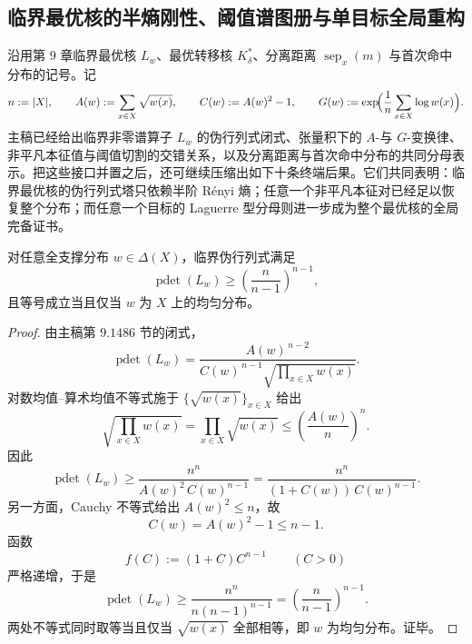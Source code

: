 \subsection{临界最优核的半熵刚性、阈值谱图册与单目标全局重构}\label{subsec:conclusion-critical-kernel-halfentropy-threshold-hitting-reconstruction}
沿用第 \(9\) 章临界最优核 \(L_w\)、最优转移核 \(K_\delta^\ast\)、分离距离 \(\operatorname{sep}_x(m)\) 与首次命中分布的记号。记
\[
n:=|X|,
\qquad
A(w):=\sum_{x\in X}\sqrt{w(x)},
\qquad
C(w):=A(w)^2-1,
\qquad
G(w):=\exp\!\Bigl(\frac1n\sum_{x\in X}\log w(x)\Bigr).
\]
主稿已经给出临界非零谱算子 \(L_w\) 的伪行列式闭式、张量积下的 \(A\)-与 \(G\)-变换律、非平凡本征值与阈值切割的交错关系，以及分离距离与首次命中分布的共同分母表示。把这些接口并置之后，还可继续压缩出如下十条终端后果。它们共同表明：临界最优核的伪行列式塔只依赖半阶 Rényi 熵；任意一个非平凡本征对已经足以恢复整个分布；而任意一个目标的 Laguerre 型分母则进一步成为整个最优核的全局完备证书。

\begin{theorem}[临界伪行列式的唯一极小者为均匀分布]\label{thm:conclusion-critical-kernel-pdet-uniform-minimizer}
对任意全支撑分布 \(w\in \Delta(X)\)，临界伪行列式满足
\[
\operatorname{pdet}(L_w)\ge \left(\frac{n}{n-1}\right)^{n-1},
\]
且等号成立当且仅当 \(w\) 为 \(X\) 上的均匀分布。
\end{theorem}
\begin{proof}
由主稿第 \(9.1486\) 节的闭式，
\[
\operatorname{pdet}(L_w)
=
\frac{A(w)^{\,n-2}}{C(w)^{\,n-1}\sqrt{\prod_{x\in X}w(x)}}.
\]
对数均值--算术均值不等式施于 \(\{\sqrt{w(x)}\}_{x\in X}\) 给出
\[
\sqrt{\prod_{x\in X}w(x)}
=
\prod_{x\in X}\sqrt{w(x)}
\le
\left(\frac{A(w)}{n}\right)^n.
\]
因此
\[
\operatorname{pdet}(L_w)
\ge
\frac{n^n}{A(w)^2\,C(w)^{n-1}}
=
\frac{n^n}{(1+C(w))\,C(w)^{n-1}}.
\]
另一方面，Cauchy 不等式给出 \(A(w)^2\le n\)，故
\[
C(w)=A(w)^2-1\le n-1.
\]
函数
\[
f(C):=(1+C)C^{n-1}\qquad (C>0)
\]
严格递增，于是
\[
\operatorname{pdet}(L_w)
\ge
\frac{n^n}{n(n-1)^{n-1}}
=
\left(\frac{n}{n-1}\right)^{n-1}.
\]
两处不等式同时取等当且仅当 \(\sqrt{w(x)}\) 全部相等，即 \(w\) 为均匀分布。证毕。
\end{proof}

